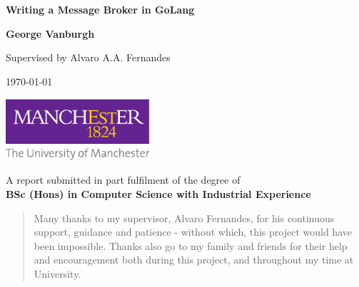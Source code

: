 \documentclass[a4paper,12pt,titlepage]{report}
\begin{document}
  
  

  \begin{titlepage}
    \begin{center}
        \vspace*{1cm}

        \Huge
        \textbf{Writing a Message Broker in GoLang}

        \vspace{2.0cm}
        \LARGE

        \textbf{George Vanburgh}

        \vspace{0.5cm}
        Supervised by Alvaro A.A. Fernandes

        \vspace{0.5cm}
        \today

        \vfill

        \includegraphics[width=0.4\textwidth]{figures/manchesterLogo}

        \vspace{0.8cm}
        \large

        A report submitted in part fulfilment of the degree of \\
        \textbf{BSc (Hons) in Computer Science with Industrial Experience}

    \end{center}
  \end{titlepage}

  \begin{abstract}
    
  \end{abstract}

  \renewcommand{\abstractname}{Acknowledgements}
  \begin{abstract}
    Many thanks to my supervisor, Alvaro Fernandes, for his continuous support,
    guidance and patience - without which, this project would have been
    impossible. Thanks also go to my family and friends for their help and
    encouragement both during this project, and throughout my time at
    University.
  \end{abstract}

  \tableofcontents

  \newpage

  

  

  

  

  

  

  \begin{appendix}
    
  \end{appendix}

  \newpage

  \printglossaries

  \newpage

  \printbibliography
\end{document}
